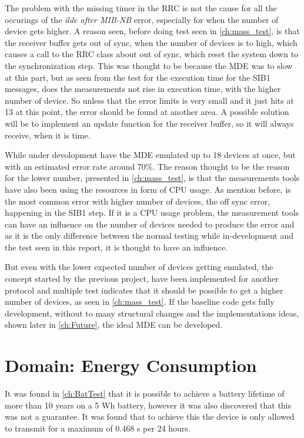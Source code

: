 The problem with the missing timer in the RRC is not the cause for all the occurings of the \textit{ilde after MIB-NB} error, especially for when the number of device gets higher. A reason seen, before doing test seen in \autoref{ch:mass_test}, is that the receiver buffer gets out of sync, when the number of devices is to high, which causes a call to the RRC class about out of sync, which reset the system down to the synchronization step. This was thought to be because the MDE was to slow at this part, but as seen from the test for the execution time for the SIB1 messages, does the measurements not rise in execution time, with the higher number of device. So unless that the error limits is very small and it just hits at 13 at this point, the error should be found at another area. A possible solution will be to implement an update function for the receiver buffer, so it will always receive, when it is time.

While under devolopment have the MDE emulated up to 18 devices at once, but with an estimated error rate around 70$\%$. The reason thought to be the reason for the lower number, presented in \autoref{ch:mass_test}, is that the measurements tools have also been using the resources in form of CPU usage. As mention before, is the most common error with higher number of devices, the off sync error, happening in the SIB1 step. If it is a CPU usage problem, the measurement tools can have an influence on the number of devices needed to produce the error and as it is the only difference between the normal testing while in-development and the test seen in this report, it is thought to have an influence.

But even with the lower expected number of devices getting emulated, the concept started by the previous project, have been implemented for another protocol and multiple test indicates that it should be possible to get a higher number of devices, as seen in \autoref{ch:mass_test}. If the baseline code gets fully development, without to many structural changes and the implementations ideas, shown later in \autoref{ch:Future}, the ideal MDE can be developed.




\section{Domain: Energy Consumption}
It was found in \autoref{ch:BatTest} that it is possible to achieve a battery lifetime of more than 10 years on a 5 Wh battery, however it was also discovered that this was not a guarantee. It was found that to achieve this the device is only allowed to transmit for a maximum of 0.468 s per 24 hours. 

